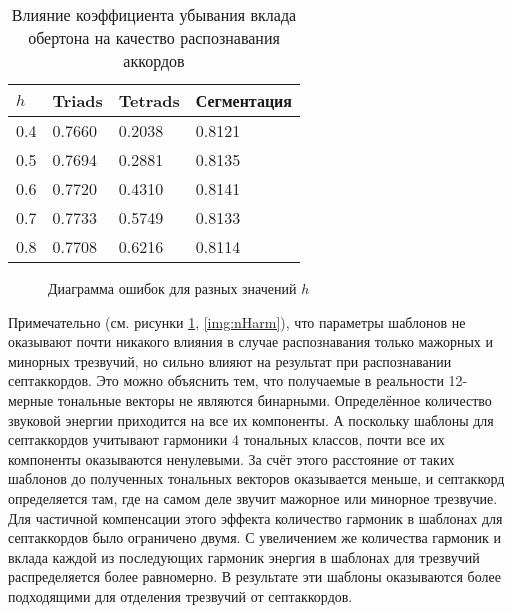 \begin{table} [htbp]
  \centering
  \parbox{15cm}{\caption{Влияние коэффициента убывания вклада обертона на
  качество распознавания аккордов} \label{Th}}
  \begin{tabular}{|l|l|l|l|}
  \hline
  $h$ & Triads & Tetrads & Сегментация \\
  \hline
  0.4 & 0.7660 & 0.2038 & 0.8121 \\
  0.5 & 0.7694 & 0.2881 & 0.8135 \\
  0.6 & 0.7720 & 0.4310 & 0.8141 \\
  0.7 & 0.7733 & 0.5749 & 0.8133 \\
  0.8 & 0.7708 & 0.6216 & 0.8114 \\
  \hline
  \end{tabular}
\end{table}

\begin{figure}[h]
  \begin{minipage}[h]{0.49\linewidth}
  \end{minipage}
  \hfill
  \begin{minipage}[h]{0.49\linewidth}
  \end{minipage}
  \caption{Диаграмма ошибок для разных значений $h$}
  \label{img:h}
\end{figure}

Примечательно (см. рисунки \ref{img:h}, \ref{img:nHarm}), что параметры шаблонов
не оказывают почти никакого влияния в случае распознавания только мажорных и
минорных трезвучий, но сильно влияют на результат при распознавании
септаккордов. Это можно объяснить тем, что получаемые в реальности 12-мерные
тональные векторы не являются бинарными. Определённое количество звуковой
энергии приходится на все их компоненты. А поскольку шаблоны для септаккордов
учитывают гармоники 4 тональных классов, почти все их компоненты оказываются
ненулевыми. За счёт этого расстояние от таких шаблонов до полученных тональных
векторов оказывается меньше, и септаккорд определяется там, где на самом деле
звучит мажорное или минорное трезвучие. Для частичной компенсации этого эффекта
количество гармоник в шаблонах для септаккордов было ограничено двумя. С
увеличением же количества гармоник и вклада каждой из последующих гармоник
энергия в шаблонах для трезвучий распределяется более равномерно. В результате
эти шаблоны оказываются более подходящими для отделения трезвучий от
септаккордов.

